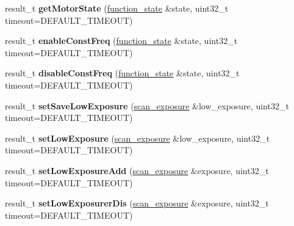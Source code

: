 \begin{DoxyCompactItemize}
\item 
result\+\_\+t {\bfseries get\+Motor\+State} (\hyperlink{structfunction__state}{function\+\_\+state} \&state, uint32\+\_\+t timeout=D\+E\+F\+A\+U\+L\+T\+\_\+\+T\+I\+M\+E\+O\+UT)\hypertarget{classydlidar_1_1_y_dlidar_driver_af5d460ababe4b8a34b02d33268f24d4d}{}\label{classydlidar_1_1_y_dlidar_driver_af5d460ababe4b8a34b02d33268f24d4d}

\item 
result\+\_\+t {\bfseries enable\+Const\+Freq} (\hyperlink{structfunction__state}{function\+\_\+state} \&state, uint32\+\_\+t timeout=D\+E\+F\+A\+U\+L\+T\+\_\+\+T\+I\+M\+E\+O\+UT)\hypertarget{classydlidar_1_1_y_dlidar_driver_a1e5c25618be9867dfdb1aa2f5e9cb93c}{}\label{classydlidar_1_1_y_dlidar_driver_a1e5c25618be9867dfdb1aa2f5e9cb93c}

\item 
result\+\_\+t {\bfseries disable\+Const\+Freq} (\hyperlink{structfunction__state}{function\+\_\+state} \&state, uint32\+\_\+t timeout=D\+E\+F\+A\+U\+L\+T\+\_\+\+T\+I\+M\+E\+O\+UT)\hypertarget{classydlidar_1_1_y_dlidar_driver_ae4b3883dd18bf01737bc4783d2dae974}{}\label{classydlidar_1_1_y_dlidar_driver_ae4b3883dd18bf01737bc4783d2dae974}

\item 
result\+\_\+t {\bfseries set\+Save\+Low\+Exposure} (\hyperlink{structscan__exposure}{scan\+\_\+exposure} \&low\+\_\+exposure, uint32\+\_\+t timeout=D\+E\+F\+A\+U\+L\+T\+\_\+\+T\+I\+M\+E\+O\+UT)\hypertarget{classydlidar_1_1_y_dlidar_driver_a73ef6628afc1eadf2f3079db99b383c6}{}\label{classydlidar_1_1_y_dlidar_driver_a73ef6628afc1eadf2f3079db99b383c6}

\item 
result\+\_\+t {\bfseries set\+Low\+Exposure} (\hyperlink{structscan__exposure}{scan\+\_\+exposure} \&low\+\_\+exposure, uint32\+\_\+t timeout=D\+E\+F\+A\+U\+L\+T\+\_\+\+T\+I\+M\+E\+O\+UT)\hypertarget{classydlidar_1_1_y_dlidar_driver_a02257e37b792870a9c42f8abfbe543ad}{}\label{classydlidar_1_1_y_dlidar_driver_a02257e37b792870a9c42f8abfbe543ad}

\item 
result\+\_\+t {\bfseries set\+Low\+Exposure\+Add} (\hyperlink{structscan__exposure}{scan\+\_\+exposure} \&exposure, uint32\+\_\+t timeout=D\+E\+F\+A\+U\+L\+T\+\_\+\+T\+I\+M\+E\+O\+UT)\hypertarget{classydlidar_1_1_y_dlidar_driver_a3f34ad1119b9b97c4af3936e80c182f4}{}\label{classydlidar_1_1_y_dlidar_driver_a3f34ad1119b9b97c4af3936e80c182f4}

\item 
result\+\_\+t {\bfseries set\+Low\+Exposurer\+Dis} (\hyperlink{structscan__exposure}{scan\+\_\+exposure} \&exposure, uint32\+\_\+t timeout=D\+E\+F\+A\+U\+L\+T\+\_\+\+T\+I\+M\+E\+O\+UT)\hypertarget{classydlidar_1_1_y_dlidar_driver_aece83871e5912d19bc7677676a5511f8}{}\label{classydlidar_1_1_y_dlidar_driver_aece83871e5912d19bc7677676a5511f8}


\end{DoxyCompactItemize}
